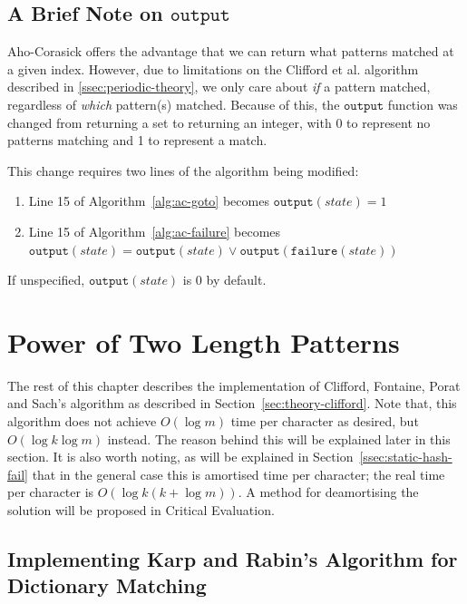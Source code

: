 \documentclass[ %
                    author={Dominic Joseph Moylett},
                    degree={MEng},
                     title={Dictionary Matching with Fingerprints},
                  subtitle={An Empirical Analysis},
                      type={Research},
                      year={2014} ]{dissertation}
\begin{document}
\subsection{A Brief Note on $\texttt{output}$}

Aho-Corasick offers the advantage that we can return what patterns matched at a given index. However, due to limitations on the Clifford et al. algorithm described in \ref{ssec:periodic-theory}, we only care about \textit{if} a pattern matched, regardless of \textit{which} pattern(s) matched. Because of this, the $\texttt{output}$ function was changed from returning a set to returning an integer, with 0 to represent no patterns matching and 1 to represent a match.

This change requires two lines of the algorithm being modified:

\begin{enumerate}
  \item Line 15 of Algorithm~\ref{alg:ac-goto} becomes $\texttt{output}(state) = 1$
  \item Line 15 of Algorithm~\ref{alg:ac-failure} becomes $\texttt{output}(state) = \texttt{output}(state) \vee \texttt{output}(\texttt{failure}(state))$
\end{enumerate}

If unspecified, $\texttt{output}(state)$ is 0 by default.

\section{Power of Two Length Patterns}

The rest of this chapter describes the implementation of Clifford, Fontaine, Porat and Sach's algorithm as described in Section~\ref{sec:theory-clifford}. Note that, this algorithm does not achieve $O(\log m)$ time per character as desired, but $O(\log k\log m)$ instead. The reason behind this will be explained later in this section. It is also worth noting, as will be explained in Section~\ref{ssec:static-hash-fail} that in the general case this is amortised time per character; the real time per character is $O(\log k(k + \log m))$. A method for deamortising the solution will be proposed in Critical Evaluation.

\subsection{Implementing Karp and Rabin's Algorithm for Dictionary Matching}
\end{document}
